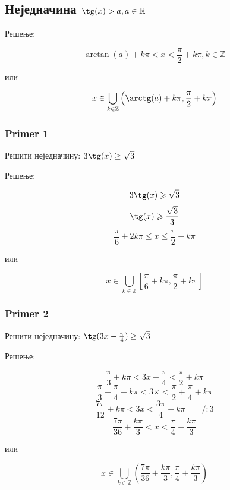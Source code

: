 \documentclass[../diplomski.tex]{subfiles}
\begin{document}
\subsection{Неједначина $\tg(x)>a,a\in\mathbb{R}$}

Решење:

\[\arctan(a)+k\pi<x<\frac{\pi}{2}+k\pi,k\in\mathbb{Z}\]
\centerline{или}
\[x\in\bigcup_{k\in\mathbb{Z}}\left(\arctg(a)+k\pi,\frac{\pi}{2}+k\pi\right)\]

\subsubsection{Primer 1}

Решити неједначину: $3\tg(x)\ge\sqrt3$

Решење:

\[3\tg(x)\geqslant\sqrt{3}\]
\[\tg(x)\geqslant\frac{\sqrt{3}}{3}\]
\[\frac{\pi}{6}+2k\pi\leqslant x\leqslant\frac{\pi}{2}+k\pi\]
\centerline{или}
\[x\in\bigcup_{k\in\mathbb{Z}}\left[\frac{\pi}{6}+k\pi,\frac{\pi}{2}+k\pi\right]\]

\subsubsection{Primer 2}

Решити неједначину: $\tg(3x-\frac{\pi}{4})\ge\sqrt3$

Решење:

\[\frac{\pi}{3}+k\pi<3x-\frac{\pi}{4}<\frac{\pi}{2}+k\pi\]
\[\frac{\pi}{3}+\frac{\pi}{4}+k\pi<3\times<\frac{\pi}{2}+\frac{\pi}{4}+k\pi\]
\[\frac{7\pi}{12}+k\pi<3x<\frac{3\pi}{4}+k\pi\qquad/:3\]
\[\frac{7\pi}{36}+\frac{k\pi}{3}<x<\frac{\pi}{4}+\frac{k\pi}{3}\]
\centerline{или}
\[x\in\bigcup_{k\in\mathbb{Z}}\left(\frac{7\pi}{36}+\frac{k\pi}{3},\frac{\pi}{4}+\frac{k\pi}{3}\right)\]
\end{document}

